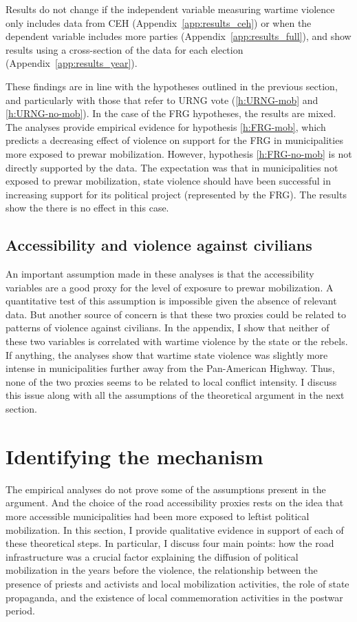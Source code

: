 \documentclass[12pt, notitlepage]{article}
\begin{document}
Results do not change if the independent variable measuring wartime violence only includes data from CEH (Appendix~\ref{app:results_ceh}) or when the dependent variable includes more parties (Appendix~\ref{app:results_full}), and show results using a cross-section of the data for each election (Appendix~\ref{app:results_year}).

These findings are in line with the hypotheses outlined in the previous section, and particularly with those that refer to URNG vote (\ref{h:URNG-mob} and \ref{h:URNG-no-mob}).
In the case of the FRG hypotheses, the results are mixed.
The analyses provide empirical evidence for hypothesis \ref{h:FRG-mob}, which predicts a decreasing effect of violence on support for the FRG in municipalities more exposed to prewar mobilization.
However, hypothesis \ref{h:FRG-no-mob} is not directly supported by the data.
The expectation was that in municipalities not exposed to prewar mobilization, state violence should have been successful in increasing support for its political project (represented by the FRG).
The results show the there is no effect in this case.

\subsection*{Accessibility and violence against civilians}

An important assumption made in these analyses is that the accessibility variables are a good proxy for the level of exposure to prewar mobilization.
A quantitative test of this assumption is impossible given the absence of relevant data.
But another source of concern is that these two proxies could be related to patterns of violence against civilians.
In the appendix, I show that neither of these two variables is correlated with wartime violence by the state or the rebels.
If anything, the analyses show that wartime state violence was slightly more intense in municipalities further away from the Pan-American Highway.
Thus, none of the two proxies seems to be related to local conflict intensity.
I discuss this issue along with all the assumptions of the theoretical argument in the next section.

\section*{Identifying the mechanism}

The empirical analyses do not prove some of the assumptions present in the argument.
And the choice of the road accessibility proxies rests on the idea that more accessible municipalities had been more exposed to leftist political mobilization.
In this section, I provide qualitative evidence in support of each of these theoretical steps.
In particular, I discuss four main points: how the road infrastructure was a crucial factor explaining the diffusion of political mobilization in the years before the violence, the relationship between the presence of priests and activists and local mobilization activities, the role of state propaganda, and the existence of local commemoration activities in the postwar period.
\end{document}
